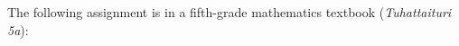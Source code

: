 \documentclass[output=paper]{langscibook}
\begin{document}


The following assignment is in a fifth-grade mathematics textbook (\textit{Tuhattaituri 5a}):
\end{document}

